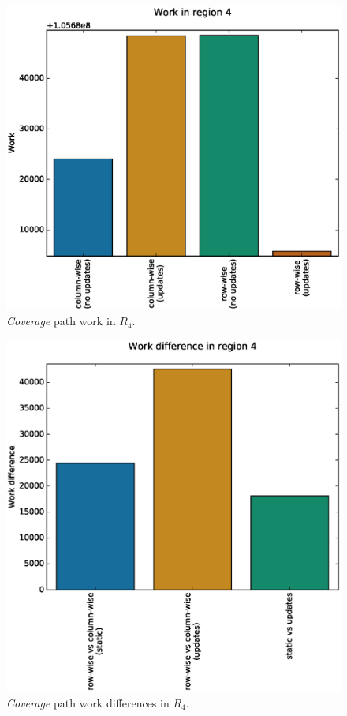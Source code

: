 \documentclass{tamuccthesis}
\begin{document}
\begin{figure}[H]
    \captionsetup{justification=centering}
    \centering
    \includegraphics[width=\textwidth,trim={0cm 0cm 0cm 0.75cm},clip]{work_r4.eps}
    \caption{\textit{Coverage} path work in $R_4$.}
    \label{fig:coverage_noterrain_work_r4}
\end{figure}
\begin{figure}[H]
    \captionsetup{justification=centering}
    \centering
    \includegraphics[width=\textwidth,trim={0cm 0cm 0cm 0.75cm},clip]{diff_r4.eps}
    \caption{\textit{Coverage} path work differences in $R_4$.}
    \label{fig:coverage_noterrain_diff_r4}
\end{figure}
\end{document}
